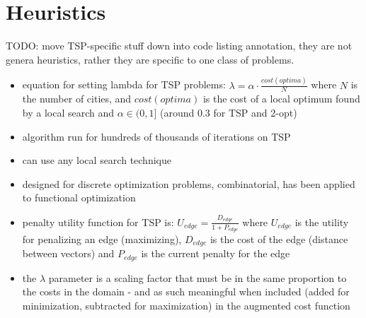 \documentclass[a4paper, 11pt]{article}
\begin{document}
\section{Heuristics}
\label{sec:heuristics}

TODO: move TSP-specific stuff down into code listing annotation, they are not genera heuristics, rather they are specific to one class of problems.

\begin{itemize}
	\item equation for setting lambda for TSP problems: $\lambda = \alpha\cdot\frac{cost(optima)}{N}$ where $N$ is the number of cities, and $cost(optima)$ is the cost of a local optimum found by a local search and $\alpha\in (0,1]$ (around 0.3 for TSP and 2-opt)
	\item algorithm run for hundreds of thousands of iterations on TSP
	\item can use any local search technique
	\item designed for discrete optimization problems, combinatorial, has been applied to functional optimization
	\item penalty utility function for TSP is: $U_{edge}=\frac{D_{edge}}{1+P_{edge}}$ where $U_{edge}$ is the utility for penalizing an edge (maximizing), $D_{edge}$ is the cost of the edge (distance between vectors) and $P_{edge}$ is the current penalty for the edge
	\item the $\lambda$ parameter is a scaling factor that must be in the same proportion to the costs in the domain - and as such meaningful when included (added for minimization, subtracted for maximization) in the augmented cost function
\end{itemize}

\end{document}
